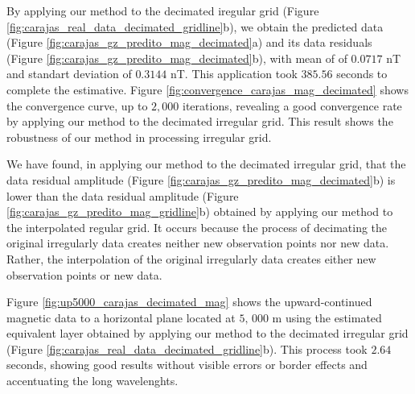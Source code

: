 By applying our method to the decimated iregular grid 
(Figure \ref{fig:carajas_real_data_decimated_gridline}b), we  obtain the  predicted data 
(Figure \ref{fig:carajas_gz_predito_mag_decimated}a) and its data residuals 
(Figure \ref{fig:carajas_gz_predito_mag_decimated}b), with mean of  of $0.0717$ nT and standart deviation of $0.3144$ nT. This application took $385.56$ seconds to complete the estimative.
Figure \ref{fig:convergence_carajas_mag_decimated} shows the convergence curve, up to $2,000$ iterations, revealing a good convergence rate by applying our method to the decimated irregular grid. 
This result shows the  robustness of our method in processing irregular grid.

We have found, in applying our method to the decimated irregular grid, that the data residual amplitude (Figure \ref{fig:carajas_gz_predito_mag_decimated}b) is lower than the data residual amplitude (Figure 
\ref{fig:carajas_gz_predito_mag_gridline}b) obtained by applying our method to the interpolated regular grid.
It occurs because  the  process of decimating the original irregularly data creates neither new observation points nor new data. Rather, the interpolation of the original irregularly data creates either new observation points or new data. 

Figure \ref{fig:up5000_carajas_decimated_mag} shows the upward-continued magnetic data  to a horizontal plane located at $5, \,000$ m using the estimated equivalent layer obtained by applying our method to the decimated irregular grid (Figure \ref{fig:carajas_real_data_decimated_gridline}b).
This process took $2.64$ seconds, showing good results without visible errors or border effects and accentuating the long wavelenghts.